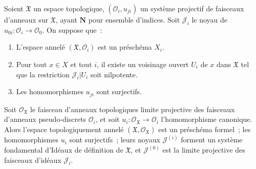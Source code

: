\begin{proposition}[10.6.3]
\label{I.10.6.3-fr}
Soient $\mathfrak{X}$ un espace topologique,
$(\mathscr{O}_i,u_{ji})$ un système projectif de faisceaux d'anneaux sur
$\mathfrak{X}$, ayant $\mathbf{N}$ pour ensemble d'indices. Soit
$\mathscr{J}_i$ le noyau de
$u_{0i}:\mathscr{O}_i\to\mathscr{O}_0$. On suppose que~:
\begin{enumerate}
  \item[a)] L'espace annelé $(\mathfrak{X},\mathscr{O}_i)$ est un
    préschéma $X_i$.
  \item[b)] Pour tout $x\in X$ et tout $i$, il existe un voisinage
    ouvert $U_i$ de $x$ dans $\mathfrak{X}$ tel que la restriction
    $\mathscr{J}_i|U_i$ soit nilpotente.
  \item[c)] Les homomorphismes $u_{ji}$ sont surjectifs.
\end{enumerate}


Soit $\mathscr{O}_{\mathfrak{X}}$ le faisceau d'anneaux topologiques
limite projective des faisceaux d'anneaux pseudo-discrets
$\mathscr{O}_i$, et soit
$u_i:\mathscr{O}_{\mathfrak{X}}\to\mathscr{O}_i$ l'homomorphisme
canonique. Alors l'espace topologiquement annelé
$(\mathfrak{X},\mathscr{O}_{\mathfrak{X}})$ est un préschéma formel~;
les homomorphismes $u_i$ sont surjectifs~; leurs noyaux
$\mathscr{J}^{(i)}$ forment un système fondamental d'Idéaux de définition
de $\mathfrak{X}$, et $\mathscr{J}^{(0)}$ est la limite projective des
faisceaux d'idéaux $\mathscr{J}_i$.
\end{proposition}

